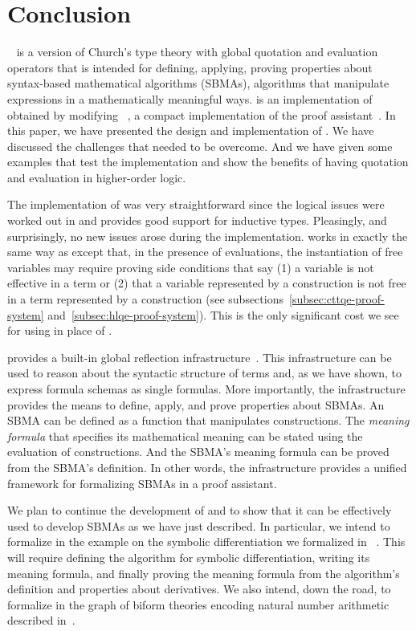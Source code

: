 \documentclass[fleqn]{llncs}
\begin{document}
\section{Conclusion}\label{sec:conclusion}

{\churchqe}~\cite{Farmer16,Farmer18} is a version of Church's
type theory with global quotation and evaluation operators that is
intended for defining, applying, proving properties about syntax-based
mathematical algorithms (SBMAs), algorithms that manipulate
expressions in a mathematically meaningful ways.  {\HLQE} is an
implementation of {\churchqe} obtained by modifying
{\HL}~\cite{Harrison09}, a compact implementation of the {\HOL} proof
assistant~\cite{GordonMelham93}.  In this paper, we have presented the
design and implementation of {\HLQE}.  We have discussed the
challenges that needed to be overcome.  And we have given some
examples that test the implementation and show the benefits of having
quotation and evaluation in higher-order logic.

The implementation of {\HLQE} was very straightforward since the
logical issues were worked out in {\churchqe} and {\HL} provides good
support for inductive types.  Pleasingly, and surprisingly, no new
issues arose during the implementation. {\HLQE} works in exactly the
same way as {\HL} except that, in the presence of evaluations, the 
instantiation of free variables may require proving side conditions 
that say (1) a variable is not effective in a term or (2) that a variable
represented by a construction is not free in a term represented by a
construction (see subsections~\ref{subsec:cttqe-proof-system}
and~\ref{subsec:hlqe-proof-system}).  This is the only significant
cost we see for using {\HLQE} in place of {\HL}.

{\HLQE} provides a built-in global reflection
infrastructure~\cite{Farmer18}.  This infrastructure can be used
to reason about the syntactic structure of terms and, as we have
shown, to express formula schemas as single formulas.  More
importantly, the infrastructure provides the means to define, apply,
and prove properties about SBMAs.  An SBMA can be defined as a
function that manipulates constructions.  The \emph{meaning formula}
that specifies its mathematical meaning can be stated using the
evaluation of constructions.  And the SBMA's meaning formula can be
proved from the SBMA's definition. In other words, the infrastructure
provides a unified framework for formalizing SBMAs in a proof
assistant.

We plan to continue the development of {\HLQE} and to show that it can
be effectively used to develop SBMAs as we have just described.  In
particular, we intend to formalize in {\HLQE} the example on the
symbolic differentiation we formalized in {\churchqe}~\cite{Farmer18}.
This will require defining the algorithm for symbolic differentiation,
writing its meaning formula, and finally proving the meaning formula
from the algorithm's definition and properties about derivatives.  We
also intend, down the road, to formalize in {\HLQE} the graph of
biform theories encoding natural number arithmetic described
in~\cite{CaretteFarmer17}.




\end{document}
